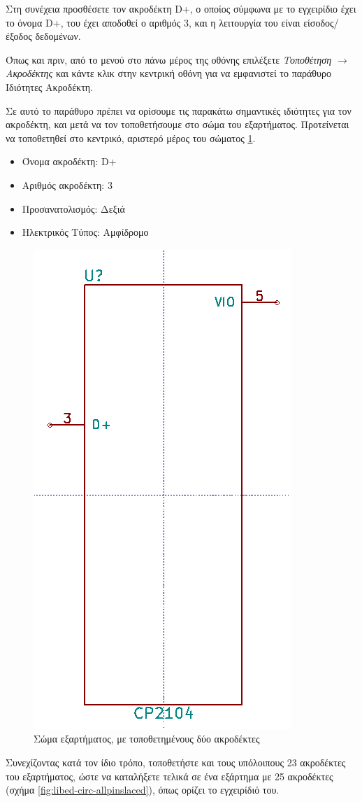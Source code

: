 \documentclass[a4paper]{article}
\begin{document}
Στη συνέχεια προσθέσετε τον ακροδέκτη D+, ο οποίος σύμφωνα με το εγχειρίδιο έχει το όνομα D+, του έχει αποδοθεί ο αριθμός 3, και η λειτουργία του είναι είσοδος/έξοδος δεδομένων.

Όπως και πριν, από το μενού στο πάνω μέρος της οθόνης επιλέξετε \textit{Τοποθέτηση $\rightarrow$ Ακροδέκτης} και κάντε κλικ στην κεντρική οθόνη για να εμφανιστεί το παράθυρο Ιδιότητες Ακροδέκτη.

Σε αυτό το παράθυρο πρέπει να ορίσουμε τις παρακάτω σημαντικές ιδιότητες για τον ακροδέκτη, και μετά να τον τοποθετήσουμε στο σώμα του εξαρτήματος. Προτείνεται να τοποθετηθεί στο κεντρικό, αριστερό μέρος του σώματος \ref{fig:libed-circ-twopinslaced}.

\begin{itemize}
    \item Όνομα ακροδέκτη: D+
    \item Αριθμός ακροδέκτη: 3
    \item Προσανατολισμός: Δεξιά
    \item Ηλεκτρικός Τύπος: Αμφίδρομο
\end{itemize}

\begin{figure}
  \begin{center}
    \includegraphics[width=.2\textwidth]{img/libed-circ-twopinslaced.png}
    \caption{Σώμα εξαρτήματος, με τοποθετημένους δύο ακροδέκτες}
    \label{fig:libed-circ-twopinslaced}
  \end{center}
\end{figure}

Συνεχίζοντας κατά τον ίδιο τρόπο, τοποθετήστε και τους υπόλοιπους 23 ακροδέκτες του εξαρτήματος, ώστε να καταλήξετε τελικά σε ένα εξάρτημα με 25 ακροδέκτες (σχήμα \ref{fig:libed-circ-allpinslaced}), όπως ορίζει το εγχειρίδιό του.
\end{document}
